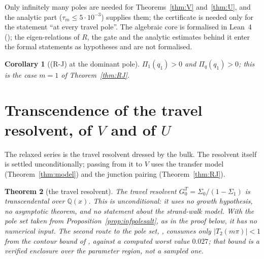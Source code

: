 \documentclass[11pt]{article}
\theoremstyle{plain}
\newtheorem{theorem}{Theorem}
\newtheorem{corollary}[theorem]{Corollary}
\theoremstyle{definition}
\theoremstyle{remark}
\newcommand{\Q}{\mathbb{Q}}
\theoremstyle{plain}\newtheorem*{maintheorem}{Main Theorem}
\begin{document}
\noindent Only infinitely many poles are needed for Theorems~\ref{thm:V} and~\ref{thm:U}, and the
analytic part ($\tau_m\le5\cdot10^{-3}$) supplies them; the certificate is needed only for the
statement ``at every travel pole''. The algebraic core is formalised in Lean~4
({\cite[\S\,\textup{sec:RJlean}]{Bonfioli2026bB}}); the eigen-relations of $R$, the gate and the analytic estimates behind it enter
the formal statements as hypotheses and are not formalised.

\begin{corollary}[\textup{(R-J)} at the dominant pole]\label{prop:RJdominant}
$\Pi_1(q_1)>0$ and $\Pi_q(q_1)>0$; this is the case $m=1$ of Theorem~\ref{thm:RJ}.
\end{corollary}

\section{Transcendence of the travel resolvent, of \texorpdfstring{$V$}{V} and of
\texorpdfstring{$U$}{U}}\label{sec:V}

The relaxed series is the travel resolvent dressed by the bulk. The resolvent itself is settled
unconditionally; passing from it to $V$ uses the transfer model (Theorem~\ref{thm:model}) and the
junction pairing (Theorem~\ref{thm:RJ}).

\begin{theorem}[the travel resolvent]\label{thm:travelres}
The travel resolvent $G^T_0=\Sigma_0/(1-\Sigma_1)$ is transcendental over $\Q(x)$. This is
unconditional: it uses no growth hypothesis, no asymptotic theorem, and no statement about the
strand-walk model. With the pole set taken from Proposition~\ref{prop:infpolesalt}, as in the proof below, it
has no numerical input. The second route to the pole set, {\cite[Lemma ``infinitude and accumulation of the travel poles'', \textup{lem:infpoles}]{Bonfioli2026bB}}, consumes only
$|T_2(m\pi)|<1$ from the contour bound of {\cite[Lemma ``absolute bound on $T_2$'', \textup{lem:T2abs}]{Bonfioli2026bB}}, against a computed worst value
$0.027$; that bound is a verified enclosure over the parameter region, not a sampled one.
\end{theorem}
\end{document}
